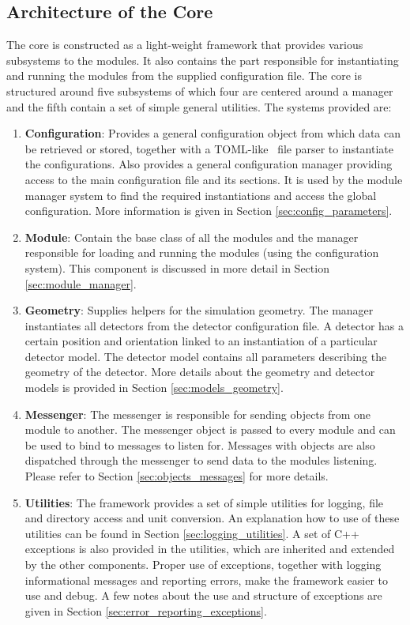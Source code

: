 \subsection{Architecture of the Core}
The core is constructed as a light-weight framework that provides various subsystems to the modules. It also contains the part responsible for instantiating and running the modules from the supplied configuration file. The core is structured around five subsystems of which four are centered around a manager and the fifth contain a set of simple general utilities. The systems provided are:
\begin{enumerate}
\item \textbf{Configuration}: Provides a general configuration object from which data can be retrieved or stored, together with a TOML-like~\cite{tomlgit} file parser to instantiate the configurations. Also provides a general \apsq configuration manager providing access to the main configuration file and its sections. It is used by the module manager system to find the required instantiations and access the global configuration. More information is given in Section \ref{sec:config_parameters}.
\item \textbf{Module}: Contain the base class of all the \apsq modules and the manager responsible for loading and running the modules (using the configuration system). This component is discussed in more detail in Section \ref{sec:module_manager}.
\item \textbf{Geometry}: Supplies helpers for the simulation geometry. The manager instantiates all detectors from the detector configuration file. A detector has a certain position and orientation linked to an instantiation of a particular detector model. The detector model contains all parameters describing the geometry of the detector. More details about the geometry and detector models is provided in Section \ref{sec:models_geometry}.
\item \textbf{Messenger}: The messenger is responsible for sending objects from one module to another. The messenger object is passed to every module and can be used to bind to messages to listen for. Messages with objects are also dispatched through the messenger to send data to the modules listening. Please refer to Section \ref{sec:objects_messages} for more details.
\item \textbf{Utilities}: The framework provides a set of simple utilities for logging, file and directory access and unit conversion. An explanation how to use of these utilities can be found in Section \ref{sec:logging_utilities}. A set of C++ exceptions is also provided in the utilities, which are inherited and extended by the other components. Proper use of exceptions, together with logging informational messages and reporting errors, make the framework easier to use and debug. A few notes about the use and structure of exceptions are given in Section \ref{sec:error_reporting_exceptions}.
\end{enumerate}

